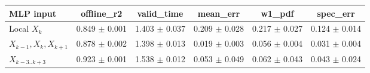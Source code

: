 \begin{tabular}{lccccc}
\toprule
MLP input & offline\_r2 & valid\_time & mean\_err & w1\_pdf & spec\_err \\
\midrule
Local $X_k$ & 0.849 $\pm$ 0.001 & 1.403 $\pm$ 0.037 & 0.209 $\pm$ 0.028 & 0.217 $\pm$ 0.027 & 0.124 $\pm$ 0.014 \\
$X_{k-1},X_k,X_{k+1}$ & 0.878 $\pm$ 0.002 & 1.398 $\pm$ 0.013 & 0.019 $\pm$ 0.003 & 0.056 $\pm$ 0.004 & 0.031 $\pm$ 0.004 \\
$X_{k-3..k+3}$ & 0.923 $\pm$ 0.001 & 1.538 $\pm$ 0.012 & 0.053 $\pm$ 0.049 & 0.062 $\pm$ 0.043 & 0.043 $\pm$ 0.024 \\
\bottomrule
\end{tabular}
